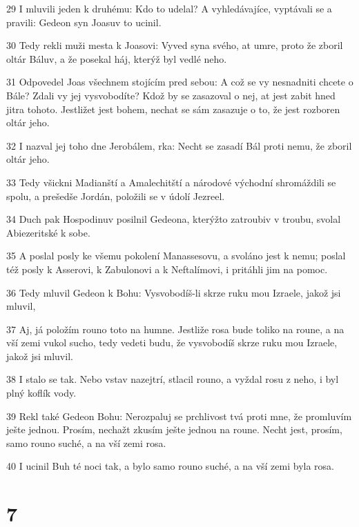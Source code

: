 \par 29 I mluvili jeden k druhému: Kdo to udelal? A vyhledávajíce, vyptávali se a pravili: Gedeon syn Joasuv to ucinil.
\par 30 Tedy rekli muži mesta k Joasovi: Vyved syna svého, at umre, proto že zboril oltár Báluv, a že posekal háj, kterýž byl vedlé neho.
\par 31 Odpovedel Joas všechnem stojícím pred sebou: A což se vy nesnadniti chcete o Bále? Zdali vy jej vysvobodíte? Kdož by se zasazoval o nej, at jest zabit hned jitra tohoto. Jestližet jest bohem, nechat se sám zasazuje o to, že jest rozboren oltár jeho.
\par 32 I nazval jej toho dne Jerobálem, rka: Necht se zasadí Bál proti nemu, že zboril oltár jeho.
\par 33 Tedy všickni Madianští a Amalechitští a národové východní shromáždili se spolu, a prešedše Jordán, položili se v údolí Jezreel.
\par 34 Duch pak Hospodinuv posilnil Gedeona, kterýžto zatroubiv v troubu, svolal Abiezeritské k sobe.
\par 35 A poslal posly ke všemu pokolení Manassesovu, a svoláno jest k nemu; poslal též posly k Asserovi, k Zabulonovi a k Neftalímovi, i pritáhli jim na pomoc.
\par 36 Tedy mluvil Gedeon k Bohu: Vysvobodíš-li skrze ruku mou Izraele, jakož jsi mluvil,
\par 37 Aj, já položím rouno toto na humne. Jestliže rosa bude toliko na roune, a na vší zemi vukol sucho, tedy vedeti budu, že vysvobodíš skrze ruku mou Izraele, jakož jsi mluvil.
\par 38 I stalo se tak. Nebo vstav nazejtrí, stlacil rouno, a vyždal rosu z neho, i byl plný koflík vody.
\par 39 Rekl také Gedeon Bohu: Nerozpaluj se prchlivost tvá proti mne, že promluvím ješte jednou. Prosím, nechažt zkusím ješte jednou na roune. Necht jest, prosím, samo rouno suché, a na vší zemi rosa.
\par 40 I ucinil Buh té noci tak, a bylo samo rouno suché, a na vší zemi byla rosa.

\chapter{7}

